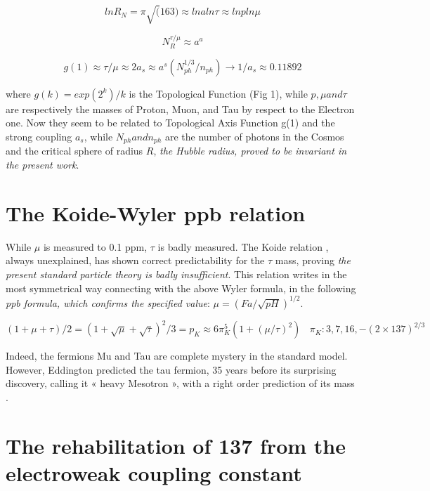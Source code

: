 \documentclass[a4paper,9pt]{article}
\begin{document}
\begin{equation}
lnR_N = \pi \sqrt(163)  \approx lna ln\tau  \approx  lnp ln\mu
\end{equation}

\begin{equation}
N_R^{\tau/\mu}  \approx a^a
\end{equation}

\begin{equation}
g(1)  \approx \tau/\mu  \approx  2a_s \approx  a^s(N_{ph}^{1/3}/n_{ph})             \rightarrow              1/a_s \approx  0.11892
\end{equation}

where $g(k) = exp(2^k)/k$ is the Topological Function (Fig 1), while $p, \mu and \tau$ are respectively the masses of Proton, Muon, and Tau by respect to the Electron one.  Now they seem to be related to Topological Axis Function g(1) and the strong coupling $a_s$, while  $N_{ph} and n_{ph}$  are the number of photons in the Cosmos and the critical sphere of radius $R$, \textit{the Hubble radius, proved to be invariant in the present work}.


\section {The Koide-Wyler ppb relation}

While $\mu$ is measured to 0.1 ppm, $\tau$ is badly measured. The Koide relation \cite{Koide}, always unexplained, has shown correct predictability for the $\tau$ mass, proving \textit{the present standard particle theory is badly insufficient}. This relation writes in the most symmetrical way connecting with the above Wyler formula, in the following \textit{ppb formula, which confirms the specified  value}: $\mu = (Fa/\sqrt{pH})^{1/2}$\cite{Sanchez}.


\begin{equation}
(1 + \mu + \tau)/2 = (1 + \sqrt{\mu} + \sqrt{\tau})^2/3 = p_K \approx 6\pi_K^5 (1+(\mu / \tau)^2) ~~~~\pi_K: 3,7,16,-(2\times 137)^{2/3}
\end{equation}

Indeed, the fermions Mu and Tau are complete mystery in the standard model. However, Eddington predicted the tau fermion, 35 years before its surprising discovery, calling it « heavy Mesotron », with a right order prediction of its mass \cite{Eddington}.

\section{The rehabilitation of 137 from the electroweak coupling constant}
\end{document}
